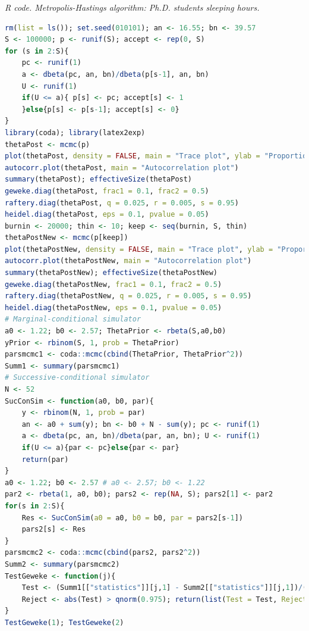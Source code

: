 \begin{enumerate}[leftmargin=*]
\begin{tcolorbox}[enhanced,width=4.67in,center upper,
	fontupper=\large\bfseries,drop shadow southwest,sharp corners]
	\textit{R code. Metropolis-Hastings algorithm: Ph.D. students sleeping hours.}
	\begin{VF}
		\begin{lstlisting}[language=R]
rm(list = ls()); set.seed(010101); an <- 16.55; bn <- 39.57
S <- 100000; p <- runif(S); accept <- rep(0, S)
for (s in 2:S){
	pc <- runif(1)
	a <- dbeta(pc, an, bn)/dbeta(p[s-1], an, bn)
	U <- runif(1)
	if(U <= a){	p[s] <- pc; accept[s] <- 1
	}else{p[s] <- p[s-1]; accept[s] <- 0}
}
library(coda); library(latex2exp)
thetaPost <- mcmc(p)
plot(thetaPost, density = FALSE, main = "Trace plot", ylab = "Proportion")
autocorr.plot(thetaPost, main = "Autocorrelation plot")
summary(thetaPost); effectiveSize(thetaPost) 
geweke.diag(thetaPost, frac1 = 0.1, frac2 = 0.5)
raftery.diag(thetaPost, q = 0.025, r = 0.005, s = 0.95)
heidel.diag(thetaPost, eps = 0.1, pvalue = 0.05)
burnin <- 20000; thin <- 10; keep <- seq(burnin, S, thin)
thetaPostNew <- mcmc(p[keep])
plot(thetaPostNew, density = FALSE, main = "Trace plot", ylab = "Proportion")
autocorr.plot(thetaPostNew, main = "Autocorrelation plot")
summary(thetaPostNew); effectiveSize(thetaPostNew) 
geweke.diag(thetaPostNew, frac1 = 0.1, frac2 = 0.5)
raftery.diag(thetaPostNew, q = 0.025, r = 0.005, s = 0.95)
heidel.diag(thetaPostNew, eps = 0.1, pvalue = 0.05)
# Marginal-conditional simulator
a0 <- 1.22; b0 <- 2.57; ThetaPrior <- rbeta(S,a0,b0) 
yPrior <- rbinom(S, 1, prob = ThetaPrior)
parsmcmc1 <- coda::mcmc(cbind(ThetaPrior, ThetaPrior^2))
Summ1 <- summary(parsmcmc1)
# Successive-conditional simulator
N <- 52
SucConSim <- function(a0, b0, par){
	y <- rbinom(N, 1, prob = par)
	an <- a0 + sum(y); bn <- b0 + N - sum(y); pc <- runif(1)
	a <- dbeta(pc, an, bn)/dbeta(par, an, bn); U <- runif(1)
	if(U <= a){par <- pc}else{par <- par}
	return(par)
}
a0 <- 1.22; b0 <- 2.57 # a0 <- 2.57; b0 <- 1.22
par2 <- rbeta(1, a0, b0); pars2 <- rep(NA, S); pars2[1] <- par2
for(s in 2:S){
	Res <- SucConSim(a0 = a0, b0 = b0, par = pars2[s-1])
	pars2[s] <- Res
}
parsmcmc2 <- coda::mcmc(cbind(pars2, pars2^2))
Summ2 <- summary(parsmcmc2)
TestGeweke <- function(j){
	Test <- (Summ1[["statistics"]][j,1] - Summ2[["statistics"]][j,1])/(Summ1[["statistics"]][j,4]+Summ2[["statistics"]][j,4])^0.5
	Reject <- abs(Test) > qnorm(0.975); return(list(Test = Test, Reject = Reject))
}
TestGeweke(1); TestGeweke(2)
\end{lstlisting}
	\end{VF}
\end{tcolorbox} 


\end{enumerate}
